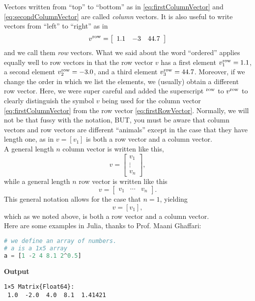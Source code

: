 Vectors written from ``top'' to ``bottom'' as in \eqref{eq:firstColumnVector} and \eqref{eq:secondColumnVector} are called \textit{column} vectors. It is also useful to write vectors from ``left'' to ``right'' as in 
\begin{equation}
    \label{eq:firstRowVector}
    v^{\rm row}=\left[\begin{array}{ccc} 1.1 & -3 & 44.7 \end{array} \right]
\end{equation}
and we call them \textit{row} vectors. What we said about the word ``ordered'' applies equally well to row vectors in that the row vector $v$ has a first element $v_1^{\rm row}=1.1$, a second element $v_2^{\rm row}=-3.0$, and a third element $v_3^{\rm row}=44.7$. Moreover, if we change the order in which we list the elements, we (usually) obtain a different row vector. Here, we were super careful and added the superscript $^{\rm row}$ to $v^{\rm row}$ to clearly distinguish the symbol $v$ being used for the column vector \eqref{eq:firstColumnVector} from the row vector \eqref{eq:firstRowVector}. Normally, we will not be that fussy with the notation, BUT, you must be aware that column vectors and row vectors are different ``animals'' except in the case that they have length one, as in $v=[v_1]$ is both a row vector and a column vector.\\

A general length $n$ column vector is written like this,
\begin{equation}
    \label{eq:nColumnVector}
    v=\left[\begin{array}{c} v_1 \\ \vdots \\ v_n \end{array} \right],
\end{equation}
while a general length $n$ row vector is written like this
\begin{equation}
    \label{eq:nRowVector}
    v=\left[\begin{array}{ccc} v_1 & \cdots & v_n \end{array} \right].
\end{equation}
This general notation allows for the case that $n=1$, yielding
$$v=[v_1], $$
which as we noted above, is both a row vector and a column vector. \\

Here are some examples in Julia, thanks to Prof. Maani Ghaffari:
\begin{lstlisting}[language=Julia,style=mystyle]
# we define an array of numbers.
# a is a 1x5 array
a = [1 -2 4 8.1 2^0.5]
\end{lstlisting}
\textbf{Output}
\begin{verbatim}
1×5 Matrix{Float64}:
 1.0  -2.0  4.0  8.1  1.41421
\end{verbatim}


